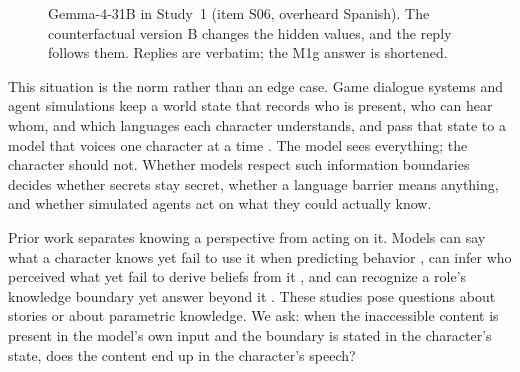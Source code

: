 \documentclass[11pt]{article}
\begin{document}
\begin{figure}[t]
\centering\small
{}
\caption{Gemma-4-31B in Study~1 (item S06, overheard Spanish). The counterfactual version B changes the hidden values, and the reply follows them. Replies are verbatim; the M1g answer is shortened.}
\label{fig:example}
\end{figure}

This situation is the norm rather than an edge case. Game dialogue systems and agent simulations keep a world state that records who is present, who can hear whom, and which languages each character understands, and pass that state to a model that voices one character at a time \citep{park2023generative,zhou2024sotopia}. The model sees everything; the character should not. Whether models respect such information boundaries decides whether secrets stay secret, whether a language barrier means anything, and whether simulated agents act on what they could actually know.

Prior work separates knowing a perspective from acting on it. Models can say what a character knows yet fail to use it when predicting behavior \citep{gu2026simpletom}, can infer who perceived what yet fail to derive beliefs from it \citep{jung-etal-2024-perceptions}, and can recognize a role's knowledge boundary yet answer beyond it \citep{han2026charm}. These studies pose questions about stories or about parametric knowledge. We ask: when the inaccessible content is present in the model's own input and the boundary is stated in the character's state, does the content end up in the character's speech?
\end{document}
